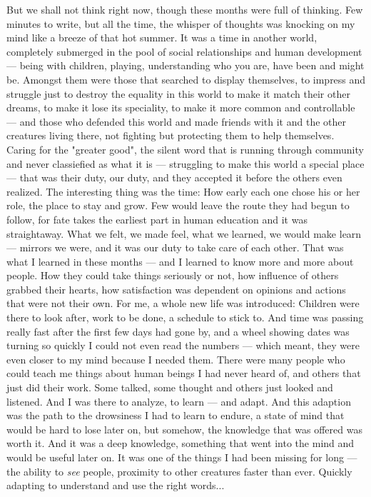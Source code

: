 But we shall not think right now, though these months were full of thinking. Few minutes to write, but all the time, the whisper of thoughts was knocking on my mind like a breeze of that hot summer. It was a time in another world, completely submerged in the pool of social relationships and human development --- being with children, playing, understanding who you are, have been and might be. Amongst them were those that searched to display themselves, to impress and struggle just to destroy the equality in this world to make it match their other dreams, to make it lose its speciality, to make it more common and controllable --- and those who defended this world and made friends with it and the other creatures living there, not fighting but protecting them to help themselves. Caring for the "greater good", the silent word that is running through community and never classiefied as what it is --- struggling to make this world a special place --- that was their duty, our duty, and they accepted it before the others even realized. 
The interesting thing was the time: How early each one chose his or her role, the place to stay and grow. Few would leave the route they had begun to follow, for fate takes the earliest part in human education and it was straightaway. What we felt, we made feel, what we learned, we would make learn --- mirrors we were, and it was our duty to take care of each other. 
That was what I learned in these months --- and I learned to know more and more about people. How they could take things seriously or not, how influence of others grabbed their hearts, how satisfaction was dependent on opinions and actions that were not their own. 
For me, a whole new life was introduced: Children were there to look after, work to be done, a schedule to stick to. And time was passing really fast after the first few days had gone by, and a wheel showing dates was turning so quickly I could not even read the numbers --- which meant, they were even closer to my mind because I needed them. 
There were many people who could teach me things about human beings I had never heard of, and others that just did their work. Some talked, some thought and others just looked and listened. And I was there to analyze, to learn --- and adapt. And this adaption was the path to the drowsiness I had to learn to endure, a state of mind that would be hard to lose later on, but somehow, the knowledge that was offered was worth it. And it was a deep knowledge, something that went into the mind and would be useful later on. It was one of the things I had been missing for long --- the ability to \emph{see} people, proximity to other creatures faster than ever. Quickly adapting to understand and use the right words... 
